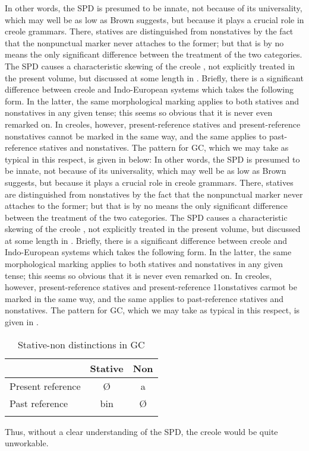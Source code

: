 In other words, the SPD is presumed to be innate, not because of its universality, which may well be as low as Brown suggests, but because it plays a crucial role in creole grammars. There, statives are distinguished from nonstatives by the fact that the nonpunctual marker never attaches to the former; but that is by no means the only signifi\-cant difference between the treatment of the two categories. The SPD causes a characteristic skewing of the creole , not explicitly treated in the present volume, but discussed at some length in \citet[Chapter 2]{Bickerton1975}. Briefly, there is a significant difference between creole and Indo-European systems which takes the following form. In the latter, the same morphological marking applies to both statives and nonstatives in any given tense; this seems so obvious that it is never even remarked on. In creoles, however, present-reference statives and present-reference nonstatives cannot be marked in the same way, and the same applies to past-reference statives and nonstatives. The pattern for GC, which we may take as typical in this respect, is given in  below:
In other words, the SPD is presumed to be innate, not because of its universality, which may well be as low as Brown suggests, but because it plays a crucial role in creole grammars. There, statives are distinguished from nonstatives by the fact that the nonpunctual marker never attaches to the former; but that is by no means the only signifi\-cant difference between the treatment of the two categories. The SPD causes a characteristic skewing of the creole , not explicitly treated in the present volume, but discussed at some length in \citet[Chapter 2]{Bickerton1975}. Briefly, there is a significant difference between creole and Indo-European systems which takes the following form. In the latter, the same morphological marking applies to both statives and nonstatives in any given tense; this seems so obvious that it is never even remarked on. In creoles, however, present-reference statives and present-reference 11onstatives carmot be marked in the same way, and the same applies to past-reference statives and nonstatives. The pattern for GC, which we may take as typical in this respect, is given in . %

\begin{table}
	\begin{tabular}{lcc}
	\lsptoprule
	& Stative & Non\isi{stative} \\
	\midrule
	Present reference & \O & a\\
	Past reference & bin & \O\\
	\lspbottomrule
	\end{tabular}
	\caption{Stative-non distinctions in GC}\label{tab:3.1}
\end{table}
Thus, without a clear understanding of the SPD, the creole  would be quite unworkable.


